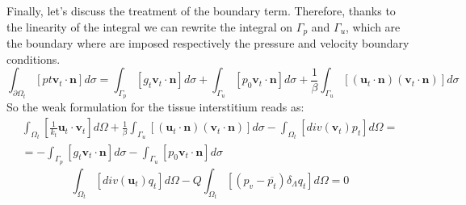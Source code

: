 \documentclass[a4paper]{report}
\begin{document}
Finally, let's discuss the treatment of the boundary term. Therefore, thanks to the linearity of the integral we can rewrite the integral on $\Gamma_p$ and $\Gamma_u$, which are the boundary where are imposed respectively the pressure and velocity boundary conditions.
\begin{equation}
\int_{\partial \Omega_t}[pt \mathbf{v}_t \cdot \mathbf{n}]d\sigma = \int_{\Gamma_p} [ g_t \mathbf{v}_t \cdot \mathbf{n}] d\sigma+\int_{\Gamma_u} [p_0 \mathbf{v}_t \cdot \mathbf{n}]d\sigma + \frac{1}{\beta}\int_{\Gamma_u}[(\mathbf{u}_t\cdot \mathbf{n})(\mathbf{v}_t \cdot \mathbf{n})]d\sigma
\end{equation}
So the weak formulation for the tissue interstitium reads as:
\begin{equation}
\begin{split}
\int_{\Omega_t} [\frac{1}{k_t} \mathbf{u}_t \cdot \mathbf{v}_t] d\Omega+ \frac{1}{\beta}\int_{\Gamma_u}[(\mathbf{u}_t\cdot \mathbf{n})(\mathbf{v}_t \cdot \mathbf{n})]d\sigma- \int_{\Omega_t} [div( \mathbf{v}_t) p_t] d\Omega  =\\
=- \int_{\Gamma_p} [ g_t \mathbf{v}_t \cdot \mathbf{n}] d\sigma-\int_{\Gamma_u} [p_0 \mathbf{v}_t \cdot \mathbf{n}]d\sigma 
\end{split}
\end{equation}
\begin{equation}
\int_{\Omega_t} [div(\mathbf{u}_t)q_t ]d\Omega - Q \int_{\Omega_t}[(p_v-\overline{p_t})\delta_{\Lambda}q_t]d\Omega =0
\end{equation}
\end{document}
